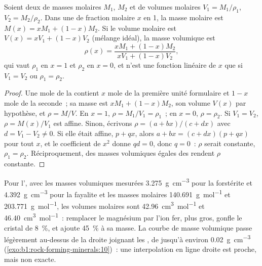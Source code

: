 \begin{proposition}\label{prop:b1:rock-forming-minerals:ideal-mixing}
Soient deux  de masses molaires $M_1$, $M_2$ et de volumes molaires
$V_1 = M_1/\rho_1$, $V_2 = M_2/\rho_2$. Dans une  de fraction
molaire $x$ en  1, la masse molaire est
$M(x) = x M_1 + (1 - x) M_2$. Si le volume molaire est
$V(x) = x V_1 + (1 - x) V_2$ (mélange idéal), la masse volumique est
\[
  \rho(x) = \frac{x M_1 + (1 - x) M_2}{x V_1 + (1 - x) V_2},
\]
qui vaut $\rho_1$ en $x = 1$ et $\rho_2$ en $x = 0$, et n'est une fonction
linéaire de $x$ que si $V_1 = V_2$ ou $\rho_1 = \rho_2$.
\end{proposition}

\begin{proof}
Une mole de la  contient $x$ mole de la première unité formulaire
et $1 - x$ mole de la seconde~; sa masse est $x M_1 + (1 - x) M_2$, son volume
$V(x)$ par hypothèse, et $\rho = M/V$. En $x = 1$, $\rho = M_1/V_1 = \rho_1$~;
en $x = 0$, $\rho = \rho_2$. Si $V_1 = V_2$, $\rho = M(x)/V_1$ est affine.
Sinon, écrivons $\rho = (a + bx)/(c + dx)$ avec $d = V_1 - V_2 \ne 0$. Si elle
était affine, $p + qx$, alors $a + bx = (c + dx)(p + qx)$ pour tout $x$, et le
coefficient de $x^2$ donne $qd = 0$, donc $q = 0$~: $\rho$ serait constante,
$\rho_1 = \rho_2$. Réciproquement, des masses volumiques égales des 
rendent $\rho$ constante.
\end{proof}

Pour l', avec les masses volumiques mesurées \qty{3.275}{g.cm^{-3}} pour
la forstérite et \qty{4.392}{g.cm^{-3}} pour la fayalite et les masses molaires
\qty{140.691}{g.mol^{-1}} et \qty{203.771}{g.mol^{-1}}, les volumes molaires sont
\qty{42.96}{cm^3.mol^{-1}} et \qty{46.40}{cm^3.mol^{-1}}~: remplacer le magnésium
par l'ion fer, plus gros, gonfle le cristal de \qty{8}{\percent}, et ajoute
\qty{45}{\percent} à sa masse. La courbe de masse volumique passe légèrement
au-dessus de la droite joignant les , de jusqu'à environ
\qty{0.02}{g.cm^{-3}} (\cref{exo:b1:rock-forming-minerals:10})~: une
interpolation en ligne droite est proche, mais non exacte.

